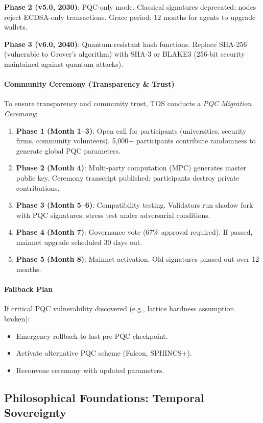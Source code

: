 \documentclass[11pt]{article}
\begin{document}
\textbf{Phase 2 (v5.0, 2030)}: PQC-only mode. Classical signatures deprecated; nodes reject ECDSA-only transactions. Grace period: 12 months for agents to upgrade wallets.

\textbf{Phase 3 (v6.0, 2040)}: Quantum-resistant hash functions. Replace SHA-256 (vulnerable to Grover's algorithm) with SHA-3 or BLAKE3 (256-bit security maintained against quantum attacks).

\paragraph{Community Ceremony (Transparency \& Trust)}
To ensure transparency and community trust, TOS conducts a \emph{PQC Migration Ceremony}:
\begin{enumerate}[noitemsep]
  \item \textbf{Phase 1 (Month 1--3)}: Open call for participants (universities, security firms, community volunteers). 5,000+ participants contribute randomness to generate global PQC parameters.
  \item \textbf{Phase 2 (Month 4)}: Multi-party computation (MPC) generates master public key. Ceremony transcript published; participants destroy private contributions.
  \item \textbf{Phase 3 (Month 5--6)}: Compatibility testing. Validators run shadow fork with PQC signatures; stress test under adversarial conditions.
  \item \textbf{Phase 4 (Month 7)}: Governance vote (67\% approval required). If passed, mainnet upgrade scheduled 30 days out.
  \item \textbf{Phase 5 (Month 8)}: Mainnet activation. Old signatures phased out over 12 months.
\end{enumerate}

\paragraph{Fallback Plan}
If critical PQC vulnerability discovered (e.g., lattice hardness assumption broken):
\begin{itemize}[noitemsep]
  \item Emergency rollback to last pre-PQC checkpoint.
  \item Activate alternative PQC scheme (Falcon, SPHINCS+).
  \item Reconvene ceremony with updated parameters.
\end{itemize}

\subsection{Philosophical Foundations: Temporal Sovereignty}
\end{document}
